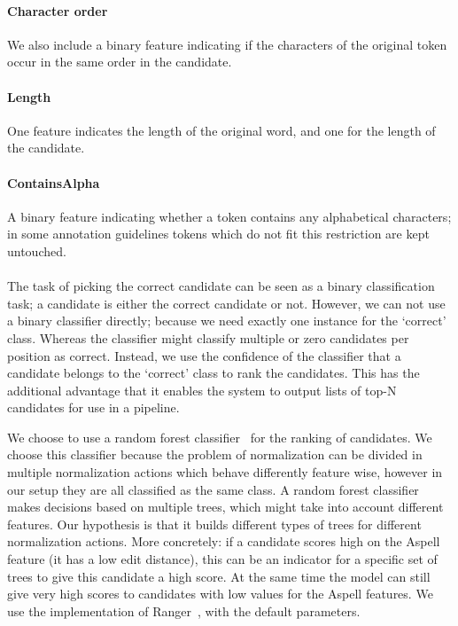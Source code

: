 \documentclass[a4paper,10pt,twoside]{article}
\begin{document}
\paragraph{Character order}
We also include a binary feature indicating if the characters of the original
token occur in the same order in the candidate.

\paragraph{Length}
One feature indicates the length of the original word, and one for the length
of the candidate.

\paragraph{ContainsAlpha}
A binary feature indicating whether a token contains any alphabetical
characters; in some annotation guidelines tokens which do not fit this
restriction are kept untouched.
\\
\\
The task of picking the correct candidate can be seen as a binary
classification task; a candidate is either the correct candidate or not.
However, we can not use a binary classifier directly; because we need exactly
one instance for the `correct' class.  Whereas the classifier might classify
multiple or zero candidates per position as correct. Instead, we use the
confidence of the classifier that a candidate belongs to the `correct' class to
rank the candidates. This has the additional advantage that it enables the
system to output lists of top-N candidates for use in a pipeline.

We choose to use a random forest classifier~\cite{breiman2001random} for the
ranking of candidates. We choose this classifier because the problem of
normalization can be divided in multiple normalization actions which behave
differently feature wise, however in our setup they are all classified as the
same class. A random forest classifier makes decisions based on multiple trees,
which might take into account different features. Our hypothesis is that it
builds different types of trees for different normalization actions. More
concretely: if a candidate scores high on the Aspell feature (it has a low edit
distance), this can be an indicator for a specific set of trees to give this
candidate a high score. At the same time the model can still give very high
scores to candidates with low values for the Aspell features.  We use the
implementation of Ranger~\cite{wright2017ranger}, with the default parameters.
\end{document}
